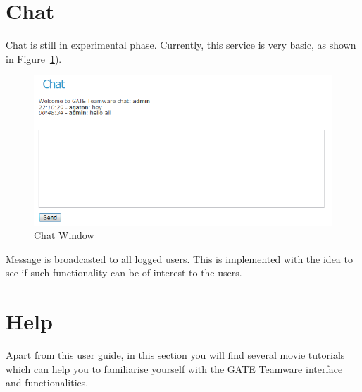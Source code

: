 \section{Chat}

Chat is still in experimental phase. Currently, this service is very basic, as shown in Figure~\ref{fig:chat}).
\begin{figure}[hb!]
\centering
\includegraphics[scale=0.4]{chat}
\caption{Chat Window}
\label{fig:chat}
\end{figure}

Message is broadcasted to all logged users. This is implemented with the idea to see if such functionality can be of interest to the users.
\section{Help}
Apart from this user guide, in this section you will find several movie tutorials which can help you to familiarise yourself with the GATE Teamware interface and functionalities.
